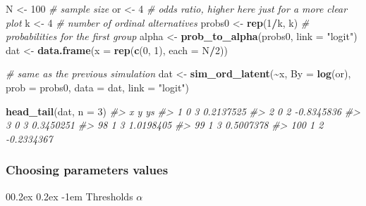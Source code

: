 \documentclass[
  man,floatsintext]{apa6}
\makeatletter
\newenvironment{Shaded}{\begin{snugshade}}{\end{snugshade}}
\newcommand{\AttributeTok}[1]{\textcolor[rgb]{0.13,0.29,0.53}{#1}}
\newcommand{\CommentTok}[1]{\textcolor[rgb]{0.56,0.35,0.01}{\textit{#1}}}
\newcommand{\DecValTok}[1]{\textcolor[rgb]{0.00,0.00,0.81}{#1}}
\newcommand{\FunctionTok}[1]{\textcolor[rgb]{0.13,0.29,0.53}{\textbf{#1}}}
\newcommand{\NormalTok}[1]{#1}
\newcommand{\OtherTok}[1]{\textcolor[rgb]{0.56,0.35,0.01}{#1}}
\newcommand{\SpecialCharTok}[1]{\textcolor[rgb]{0.81,0.36,0.00}{\textbf{#1}}}
\newcommand{\StringTok}[1]{\textcolor[rgb]{0.31,0.60,0.02}{#1}}
\let\oldparagraph\paragraph
\renewcommand{\paragraph}[1]{\oldparagraph{#1}\mbox{}}
\renewcommand{\paragraph}{\@startsection{paragraph}{4}{\parindent}%
  {0\baselineskip \@plus 0.2ex \@minus 0.2ex}%
  {-1em}%
  {\normalfont\normalsize\bfseries\itshape\typesectitle}}
\makeatother
\begin{document}
\begin{Shaded}
\begin{Highlighting}[]
\NormalTok{N }\OtherTok{\textless{}{-}} \DecValTok{100} \CommentTok{\# sample size}
\NormalTok{or }\OtherTok{\textless{}{-}} \DecValTok{4} \CommentTok{\# odds ratio, higher here just for a more clear plot}
\NormalTok{k }\OtherTok{\textless{}{-}} \DecValTok{4} \CommentTok{\# number of ordinal alternatives}
\NormalTok{probs0 }\OtherTok{\textless{}{-}} \FunctionTok{rep}\NormalTok{(}\DecValTok{1}\SpecialCharTok{/}\NormalTok{k, k) }\CommentTok{\# probabilities for the first group}
\NormalTok{alpha }\OtherTok{\textless{}{-}} \FunctionTok{prob\_to\_alpha}\NormalTok{(probs0, }\AttributeTok{link =} \StringTok{"logit"}\NormalTok{)}
\NormalTok{dat }\OtherTok{\textless{}{-}} \FunctionTok{data.frame}\NormalTok{(}\AttributeTok{x =} \FunctionTok{rep}\NormalTok{(}\FunctionTok{c}\NormalTok{(}\DecValTok{0}\NormalTok{, }\DecValTok{1}\NormalTok{), }\AttributeTok{each =}\NormalTok{ N}\SpecialCharTok{/}\DecValTok{2}\NormalTok{))}

\CommentTok{\# same as the previous simulation}
\NormalTok{dat }\OtherTok{\textless{}{-}} \FunctionTok{sim\_ord\_latent}\NormalTok{(}\SpecialCharTok{\textasciitilde{}}\NormalTok{x, }\AttributeTok{By =} \FunctionTok{log}\NormalTok{(or), }\AttributeTok{prob =}\NormalTok{ probs0, }\AttributeTok{data =}\NormalTok{ dat, }\AttributeTok{link =} \StringTok{"logit"}\NormalTok{)}

\FunctionTok{head\_tail}\NormalTok{(dat, }\AttributeTok{n =} \DecValTok{3}\NormalTok{)}
\CommentTok{\#\textgreater{}     x y         ys}
\CommentTok{\#\textgreater{} 1   0 3  0.2137525}
\CommentTok{\#\textgreater{} 2   0 2 {-}0.8345836}
\CommentTok{\#\textgreater{} 3   0 3  0.3450251}
\CommentTok{\#\textgreater{} 98  1 3  1.0198405}
\CommentTok{\#\textgreater{} 99  1 3  0.5007378}
\CommentTok{\#\textgreater{} 100 1 2 {-}0.2334367}
\end{Highlighting}
\end{Shaded}

\normalsize

\subsubsection{Choosing parameters values}\label{choosing-parameters-values}

\paragraph{\texorpdfstring{Thresholds \(\alpha\)}{Thresholds \textbackslash alpha}}\label{thresholds-alpha}
\end{document}
